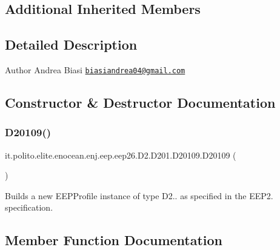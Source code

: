 \subsection*{Additional Inherited Members}


\subsection{Detailed Description}
\begin{DoxyAuthor}{Author}
Andrea Biasi \href{mailto:biasiandrea04@gmail.com}{\tt biasiandrea04@gmail.\+com} 
\end{DoxyAuthor}


\subsection{Constructor \& Destructor Documentation}
\hypertarget{classit_1_1polito_1_1elite_1_1enocean_1_1enj_1_1eep_1_1eep26_1_1_d2_1_1_d201_1_1_d20109_a261f1926c33a1aebcab18830fafabb5a}{}\label{classit_1_1polito_1_1elite_1_1enocean_1_1enj_1_1eep_1_1eep26_1_1_d2_1_1_d201_1_1_d20109_a261f1926c33a1aebcab18830fafabb5a} 
\subsubsection{\texorpdfstring{D20109()}{D20109()}}
{\footnotesize\ttfamily it.\+polito.\+elite.\+enocean.\+enj.\+eep.\+eep26.\+D2.\+D201.\+D20109.\+D20109 (\begin{DoxyParamCaption}{ }\end{DoxyParamCaption})}

Builds a new E\+E\+P\+Profile instance of type D2.. as specified in the E\+E\+P2. specification. 

\subsection{Member Function Documentation}
\hypertarget{classit_1_1polito_1_1elite_1_1enocean_1_1enj_1_1eep_1_1eep26_1_1_d2_1_1_d201_1_1_d20109_a129b92cf8ce706cc65481de4f0a1a453}{}\label{classit_1_1polito_1_1elite_1_1enocean_1_1enj_1_1eep_1_1eep26_1_1_d2_1_1_d201_1_1_d20109_a129b92cf8ce706cc65481de4f0a1a453} 
